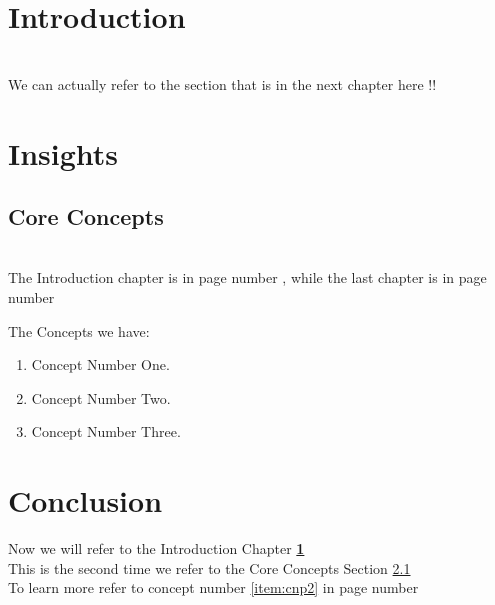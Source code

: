 \documentclass{book}
\begin{document}
	\chapter{Introduction}
	\label{chap:intro}
	\lipsum[1-2] \\
	
	We can actually refer to the section 						{\color{blue}{\ref{sec:corecns}}} that is in 			the next chapter here !!
	
	\chapter{Insights}
	
	\section{Core Concepts}
	\label{sec:corecns}
	\lipsum[1-2] \\
		
	The Introduction chapter is in page number
		\pageref{chap:intro}, while the last chapter is 		in page number \pageref{chap:conc}
	\pagebreak
	
	\noindent The Concepts we have:
	\begin{enumerate}
		\item Concept Number One.
		\item Concept Number Two. \label{item:cnp2}
		\item Concept Number Three.
	\end{enumerate}
	
	\chapter{Conclusion}
	\label{chap:conc}
	Now we will refer to the Introduction Chapter 				{\Large \textbf{\ref{chap:intro}} } \\
	This is the second time we refer to the Core 				Concepts Section \ref{sec:corecns} \\
	
	To learn more refer to concept number 						\ref{item:cnp2} in page number 								\pageref{item:cnp2}
\end{document}
